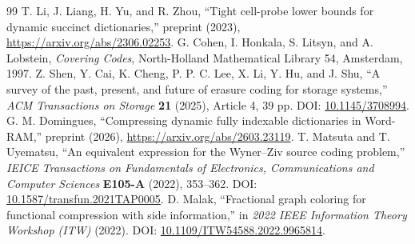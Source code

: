 \documentclass[11pt,a4paper]{article}
\begin{document}
\begin{thebibliography}{99}
 T. Li, J. Liang, H. Yu, and R. Zhou, ``Tight cell-probe lower bounds for dynamic succinct dictionaries,'' preprint (2023), \url{https://arxiv.org/abs/2306.02253}.
 G. Cohen, I. Honkala, S. Litsyn, and A. Lobstein, \emph{Covering Codes}, North-Holland Mathematical Library 54, Amsterdam, 1997.
 Z. Shen, Y. Cai, K. Cheng, P. P. C. Lee, X. Li, Y. Hu, and J. Shu, ``A survey of the past, present, and future of erasure coding for storage systems,'' \emph{ACM Transactions on Storage} \textbf{21} (2025), Article 4, 39 pp. DOI: \href{https://doi.org/10.1145/3708994}{10.1145/3708994}.
 G. M. Domingues, ``Compressing dynamic fully indexable dictionaries in Word-RAM,'' preprint (2026), \url{https://arxiv.org/abs/2603.23119}.
 T. Matsuta and T. Uyematsu, ``An equivalent expression for the Wyner--Ziv source coding problem,'' \emph{IEICE Transactions on Fundamentals of Electronics, Communications and Computer Sciences} \textbf{E105-A} (2022), 353--362. DOI: \href{https://doi.org/10.1587/transfun.2021TAP0005}{10.1587/transfun.2021TAP0005}.
 D. Malak, ``Fractional graph coloring for functional compression with side information,'' in \emph{2022 IEEE Information Theory Workshop (ITW)} (2022). DOI: \href{https://doi.org/10.1109/ITW54588.2022.9965814}{10.1109/ITW54588.2022.9965814}.
\end{thebibliography}
\end{document}
